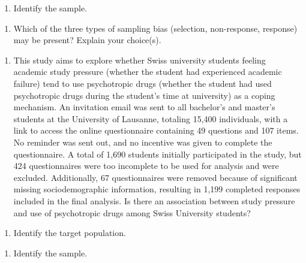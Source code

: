 \documentclass[
]{report}
\providecommand{\tightlist}{%
  \setlength{\itemsep}{0pt}\setlength{\parskip}{0pt}}
\begin{document}
\begin{enumerate}
\def\labelenumi{\alph{enumi}.}
\setcounter{enumi}{1}
\tightlist
\item
  Identify the sample.
\end{enumerate}

\vspace{0.4in}

\begin{enumerate}
\def\labelenumi{\alph{enumi}.}
\setcounter{enumi}{2}
\tightlist
\item
  Which of the three types of sampling bias (selection, non-response, response) may be present? Explain your choice(s).
\end{enumerate}

\vspace{0.5in}

\newpage

\begin{enumerate}
\def\labelenumi{\arabic{enumi}.}
\setcounter{enumi}{2}
\tightlist
\item
  This study aims to explore whether Swiss university students feeling academic study pressure (whether the student had experienced academic failure) tend to use psychotropic drugs (whether the student had used psychotropic drugs during the student's time at university) as a coping mechanism. An invitation email was sent to all bachelor's and master's students at the University of Lausanne, totaling 15,400 individuals, with a link to access the online questionnaire containing 49 questions and 107 items. No reminder was sent out, and no incentive was given to complete the questionnaire. A total of 1,690 students initially participated in the study, but 424 questionnaires were too incomplete to be used for analysis and were excluded. Additionally, 67 questionnaires were removed because of significant missing sociodemographic information, resulting in 1,199 completed responses included in the final analysis. Is there an association between study pressure and use of psychotropic drugs among Swiss University students?
\end{enumerate}

\begin{enumerate}
\def\labelenumi{\alph{enumi}.}
\tightlist
\item
  Identify the target population.
\end{enumerate}

\vspace{0.4in}

\begin{enumerate}
\def\labelenumi{\alph{enumi}.}
\setcounter{enumi}{1}
\tightlist
\item
  Identify the sample.
\end{enumerate}
\end{document}
